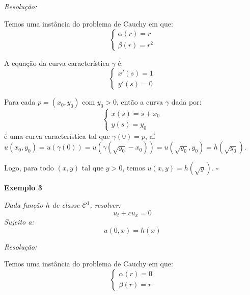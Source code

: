 \documentclass[11pt,twoside,a4paper]{book}
\begin{document}
\smallskip
\noindent
\textit{Resolução:}

\noindent
Temos uma instância do problema de Cauchy em que:
\begin{equation*}
    \begin{cases}
    \alpha(r)=r       \\
    \beta(r)=r^2      
    \end{cases}
\end{equation*}

\smallskip
\noindent
A equação da curva característica $\gamma$ é:
\begin{equation*}
    \begin{cases}
    x'(s)=1       \\
    y'(s)=0    
    \end{cases}
\end{equation*}

\smallskip
\noindent
Para cada $p=(x_0,y_0)$ com $y_0>0$, então a curva $\gamma$ dada por:
\begin{equation*}
    \begin{cases}
    x(s)=s+x_0       \\
    y(s)=y_0      
    \end{cases}
\end{equation*}
é uma curva característica tal que $\gamma(0)=p$, aí $u(x_0,y_0)=u\left(\gamma(0)\right)=u\left(\gamma\left(\sqrt{y_0}-x_0\right)\right)=u\left(\sqrt{y_0},y_0\right)=h\left(\sqrt{y_0}\right)$.

\medskip
\noindent
Logo, para todo $(x,y)$ tal que $y>0$, temos $u(x,y)=h\left(\sqrt{y}\right)$. $\square$

\bigskip
\noindent
\textbf{Exemplo 3}

\smallskip
\noindent
\textit{Dada função $h$ de classe $\mathcal{C}^1$, resolver:}
\begin{equation*}
    u_t+cu_x=0
\end{equation*}
\textit{Sujeito a:}
\begin{equation*}
    u(0,x)=h(x)
\end{equation*}

\smallskip
\noindent
\textit{Resolução:}

\noindent
Temos uma instância do problema de Cauchy em que:
\begin{equation*}
    \begin{cases}
    \alpha(r)=0       \\
    \beta(r)=r      
    \end{cases}
\end{equation*}
\end{document}
